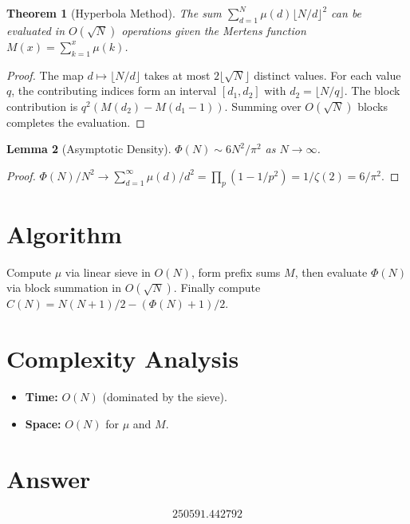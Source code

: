 \documentclass[11pt]{article}
\newtheorem{theorem}{Theorem}
\newtheorem{lemma}[theorem]{Lemma}
\begin{document}
\begin{theorem}[Hyperbola Method]
The sum $\sum_{d=1}^{N}\mu(d)\lfloor N/d\rfloor^2$ can be evaluated in $O(\sqrt{N})$ operations given the Mertens function $M(x)=\sum_{k=1}^{x}\mu(k)$.
\end{theorem}

\begin{proof}
The map $d\mapsto\lfloor N/d\rfloor$ takes at most $2\lfloor\sqrt{N}\rfloor$ distinct values. For each value~$q$, the contributing indices form an interval $[d_1,d_2]$ with $d_2=\lfloor N/q\rfloor$. The block contribution is $q^2(M(d_2)-M(d_1-1))$. Summing over $O(\sqrt{N})$ blocks completes the evaluation.
\end{proof}

\begin{lemma}[Asymptotic Density]
$\Phi(N)\sim 6N^2/\pi^2$ as $N\to\infty$.
\end{lemma}

\begin{proof}
$\Phi(N)/N^2\to\sum_{d=1}^{\infty}\mu(d)/d^2 = \prod_p(1-1/p^2)=1/\zeta(2)=6/\pi^2$.
\end{proof}

\section{Algorithm}

Compute $\mu$ via linear sieve in $O(N)$, form prefix sums $M$, then evaluate $\Phi(N)$ via block summation in $O(\sqrt{N})$. Finally compute $C(N)=N(N+1)/2-(\Phi(N)+1)/2$.

\section{Complexity Analysis}

\begin{itemize}
\item \textbf{Time:} $O(N)$ (dominated by the sieve).
\item \textbf{Space:} $O(N)$ for $\mu$ and $M$.
\end{itemize}

\section{Answer}

\[
\boxed{250591.442792}
\]
\end{document}
